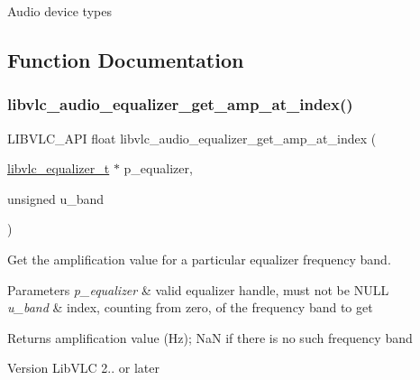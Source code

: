 Audio device types 

\subsection{Function Documentation}
\mbox{\label{group__libvlc__audio_gaa8947288ffe0d92a486e8da51ae8c3fb}} 
\subsubsection{\texorpdfstring{libvlc\+\_\+audio\+\_\+equalizer\+\_\+get\+\_\+amp\+\_\+at\+\_\+index()}{libvlc\_audio\_equalizer\_get\_amp\_at\_index()}}
{\footnotesize\ttfamily L\+I\+B\+V\+L\+C\+\_\+\+A\+PI float libvlc\+\_\+audio\+\_\+equalizer\+\_\+get\+\_\+amp\+\_\+at\+\_\+index (\begin{DoxyParamCaption}\item[{\hyperlink{group__libvlc__media__player_ga1ea141a84d68d0147fc58d99bfc83ab7}{libvlc\+\_\+equalizer\+\_\+t} $\ast$}]{p\+\_\+equalizer,  }\item[{unsigned}]{u\+\_\+band }\end{DoxyParamCaption})}

Get the amplification value for a particular equalizer frequency band.


\begin{DoxyParams}{Parameters}
{\em p\+\_\+equalizer} & valid equalizer handle, must not be N\+U\+LL \\
\hline
{\em u\+\_\+band} & index, counting from zero, of the frequency band to get \\
\hline
\end{DoxyParams}
\begin{DoxyReturn}{Returns}
amplification value (Hz); NaN if there is no such frequency band 
\end{DoxyReturn}
\begin{DoxyVersion}{Version}
Lib\+V\+LC 2.. or later 
\end{DoxyVersion}
\mbox{\label{group__libvlc__audio_ga28ddee836a9398d91d5267831a46f1aa}} 
